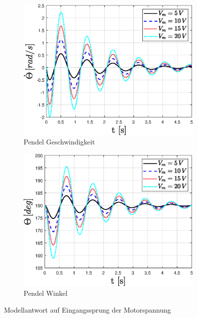 \begin{figure}
\begin{subfigure}[b]{0.49\linewidth}
    \end{subfigure}
    \begin{subfigure}[b]{0.49\linewidth}
        \includegraphics[width=\linewidth]{plot_data/parameter/fig/Vm_sprung/theta_punkt.eps}
        \caption{Pendel Geschwindigkeit}
        \label{fig:Vm_sprung_theta_punkt}      
    \end{subfigure}
    \begin{subfigure}[b]{0.49\linewidth}
        \includegraphics[width=\linewidth]{plot_data/parameter/fig/Vm_sprung/theta.eps}
        \caption{Pendel Winkel}
        \label{fig:Vm_sprung_theta}
    \end{subfigure}
        \caption{Modellantwort auf Eingangssprung der Motorspannung}
\end{figure}
